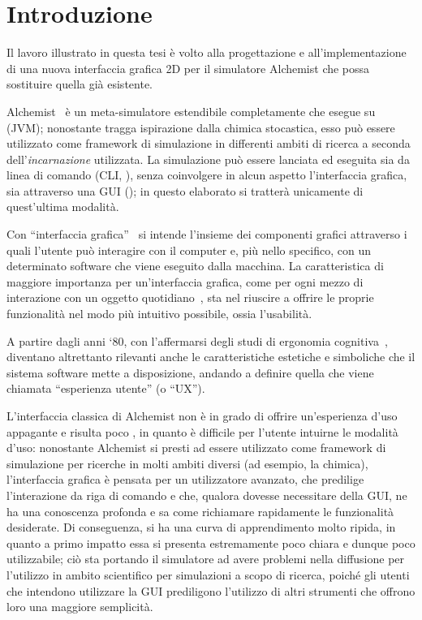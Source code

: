 
\chapter*{Introduzione}\label{ch:intro}
    Il lavoro illustrato in questa tesi è volto alla progettazione e all'implementazione di una nuova interfaccia grafica 2D per il simulatore Alchemist che possa sostituire quella già esistente.

    Alchemist~\cite{alchemist2013} è un meta-simulatore estendibile completamente  che esegue su  (JVM);
    nonostante tragga ispirazione dalla chimica stocastica, esso può essere utilizzato come framework di simulazione in differenti ambiti di ricerca a seconda dell'\emph{incarnazione} utilizzata.
    La simulazione può essere lanciata ed eseguita sia da linea di comando (CLI, ), senza coinvolgere in alcun aspetto l'interfaccia grafica, sia attraverso una GUI ();
    in questo elaborato si tratterà unicamente di quest'ultima modalità.

    Con ``interfaccia grafica''~\cite{gui} si intende l'insieme dei componenti grafici attraverso i quali l'utente può interagire con il computer e, più nello specifico, con un determinato software che viene eseguito dalla macchina.
    La caratteristica di maggiore importanza per un'interfaccia grafica, come per ogni mezzo di interazione con un oggetto quotidiano~\cite{norman1988}, sta nel riuscire a offrire le proprie funzionalità nel modo più intuitivo possibile, ossia l'usabilità.

    A partire dagli anni `80, con l'affermarsi degli studi di ergonomia cognitiva~\cite{cognitiveErgonomics}, diventano altrettanto rilevanti anche le caratteristiche estetiche e simboliche che il sistema software mette a disposizione, andando a definire quella che viene chiamata ``esperienza utente'' (o ``UX'').

    L'interfaccia classica di Alchemist non è in grado di offrire un'esperienza d'uso appagante e risulta poco , in quanto è difficile per l'utente intuirne le modalità d'uso:
    nonostante Alchemist si presti ad essere utilizzato come framework di simulazione per ricerche in molti ambiti diversi (ad esempio, la chimica), l'interfaccia grafica è pensata per un utilizzatore avanzato, che predilige l'interazione da riga di comando e che, qualora dovesse necessitare della GUI, ne ha una conoscenza profonda e sa come richiamare rapidamente le funzionalità desiderate.
    Di conseguenza, si ha una curva di apprendimento molto ripida, in quanto a primo impatto essa si presenta estremamente poco chiara e dunque poco utilizzabile;
    ciò sta portando il simulatore ad avere problemi nella diffusione per l'utilizzo in ambito scientifico per simulazioni a scopo di ricerca, poiché gli utenti che intendono utilizzare la GUI prediligono l'utilizzo di altri strumenti che offrono loro una maggiore semplicità.

